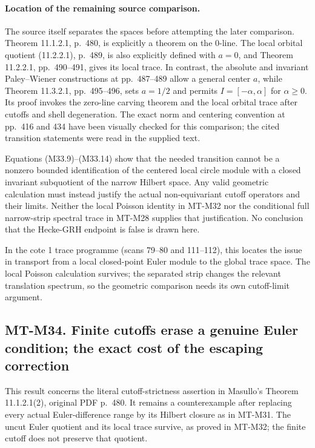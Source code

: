 \paragraph{Location of the remaining source comparison.}
The source itself separates the spaces before attempting
the later comparison.  Theorem 11.1.2.1, p.~480,
is explicitly a theorem on the $0$-line.  The local
orbital quotient (11.2.2.1), p.~489, is also explicitly
defined with $a=0$, and Theorem 11.2.2.1,
pp.~490--491, gives its local trace.
In contrast, the absolute and invariant Paley--Wiener
constructions at pp.~487--489 allow a general center
$a$, while Theorem 11.3.2.1, pp.~495--496, sets
$a=1/2$ and permits $I=[-\alpha,\alpha]$ for
$\alpha\geq0$.  Its proof invokes the zero-line
carving theorem and the local orbital trace after
cutoffs and shell degeneration.  The exact norm and
centering convention at pp.~416 and 434 have been
visually checked for this comparison; the cited
transition statements were read in the supplied text.

Equations (M33.9)--(M33.14) show that the needed transition
cannot be a nonzero bounded identification of the
centered local circle module with a closed invariant
subquotient of the narrow Hilbert space.  Any valid
geometric calculation must instead justify the actual
non-equivariant cutoff operators and their limits.
Neither the local Poisson identity in MT-M32 nor the
conditional full narrow-strip spectral trace in MT-M28
supplies that justification.  No conclusion that the
Hecke-GRH endpoint is false is drawn here.

In the cote 1 trace programme (scans 79--80 and 111--112),
this locates the issue in transport from a local
closed-point Euler module to the global trace space.
The local Poisson calculation survives; the separated
strip changes the relevant translation spectrum, so
the geometric comparison needs its own cutoff-limit
argument.

\subsection*{MT-M34. Finite cutoffs erase a genuine Euler condition;
the exact cost of the escaping correction}

This result concerns the literal cutoff-strictness assertion in
Masullo's Theorem 11.1.2.1(2), original PDF p.~480.
It remains a counterexample after replacing every actual
Euler-difference range by its Hilbert closure as in MT-M31.
The uncut Euler quotient and its local trace survive, as
proved in MT-M32; the finite cutoff does not preserve that
quotient.

